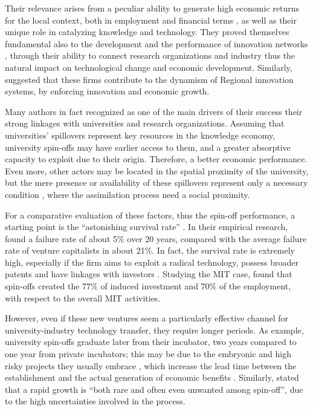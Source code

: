 Their relevance arises from a peculiar ability to generate high economic returns for the local context, both in employment and financial terms \citep{OShea2004}, as well as their unique role in catalyzing knowledge and technology. They proved themselves fundamental also to the development and the performance of innovation networks \citep{Perez2003}, through their ability to connect research organizations and industry \citep{Rizzo2015} thus the natural impact on technological change and economic development. Similarly, \citet{Perez2003} suggested that these firms contribute to the dynamism of Regional innovation systems, by enforcing innovation and economic growth.

Many authors in fact recognized as one of the main drivers of their success their strong linkages with universities and research organizations. Assuming that universities' spillovers represent key resources in the knowledge economy, university spin-offs may have earlier access to them, and a greater absorptive capacity to exploit due to their origin. Therefore, a better economic performance. Even more, other actors may be located in the spatial proximity of the university, but the mere presence or availability of these spillovers represent only a necessary condition \citep{Colombo2010}, where the assimilation process need a social proximity.

For a comparative evaluation of these factors, thus the spin-off performance, a starting point is the \enquote{astonishing survival rate} \citep{Balderi2007}. In their empirical research, \citet{Leitch2005} found a failure rate of about 5\% over 20 years, compared with the average failure rate of venture capitalists in about 21\%. In fact, the survival rate is extremely high, especially if the firm aims to exploit a radical technology, possess broader patents and have linkages with investors \citep{OShea2004}. Studying the MIT case, \citet{Rogers2001} found that spin-offs created the 77\% of induced investment and 70\% of the employment, with respect to the overall MIT activities.

However, even if these new ventures seem a particularly effective channel for university-industry technology transfer, they require longer periods. As example, university spin-offs graduate later from their incubator, two years compared to one year from private incubators; this may be due to the embryonic and high risky projects they usually embrace \citep{Rothaermel2005}, which increase the lead time between the establishment and the actual generation of economic benefits \citep{Leitch2005}. Similarly, \citet{Perez2003} stated that a rapid growth is \enquote{both rare and often even unwanted among spin-off}, due to the high uncertainties involved in the process.

